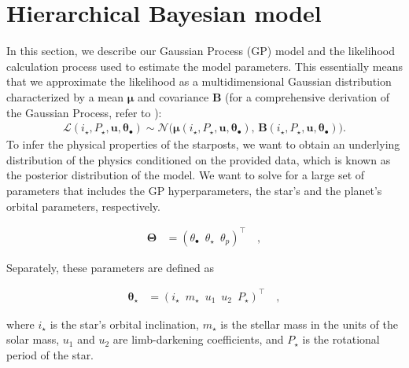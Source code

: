 \documentclass[twocolumn]{aastex631}
\begin{document}
\section{Hierarchical Bayesian model}
\label{sec:model}
In this section, we describe our Gaussian Process (GP) model and the likelihood calculation process used to estimate the model parameters.
This essentially means that we approximate the likelihood 
as a multidimensional Gaussian distribution characterized by a mean $\pmb{\mu}$ and covariance $\pmb{B}$ (for a comprehensive 
derivation of the Gaussian Process, refer to \cite{Luger2021b}):
%
\begin{align}
    \mathcal{L}\left(i_\star, P_\star, \mathbf{u}, \pmb{\theta}_\bullet\right) \sim
    \mathcal{N}\Big(
    \pmb{\mu}\left(i_\star, P_\star, \mathbf{u}, \pmb{\theta}_\bullet\right),
    \,
    \pmb{B}\left(i_\star, P_\star, \mathbf{u}, \pmb{\theta}_\bullet\right)
    \Big).
\end{align}
%
To infer the physical properties of the starposts, we want to obtain an underlying distribution of the physics conditioned on the provided data, 
which is known as the posterior distribution of the model.
We want to solve for a large set of parameters that includes the GP hyperparameters, the star's and the planet's orbital parameters, respectively. 
\begin{linenomath}\begin{align}
    \label{eq:largetheta}
    \pmb{\Theta}
     & =
    \left(
    \theta_\bullet
    \,\,\,
    \theta_\star
    \,\,\,
    \theta_p
    \right)^\top
    \quad,
\end{align}\end{linenomath}

Separately, these parameters are defined as 
\begin{linenomath}\begin{align}
    \label{eq:thetastar}
    \pmb{\theta_\star}
     & =
    \left(
    i_\star
    \,\,\,
    m_\star
    \,\,\,
    u_1
    \,\,\,
    u_2
    \,\,\,
    P_\star
    \right)^\top
    \quad,
\end{align}\end{linenomath}
where $i_\star$ is the star's orbital inclination, $m_\star$ is the stellar mass in the units of the solar mass, $u_1$ and $u_2$ are limb-darkening coefficients,
and $P_\star$ is the rotational period of the star.
\end{document}
